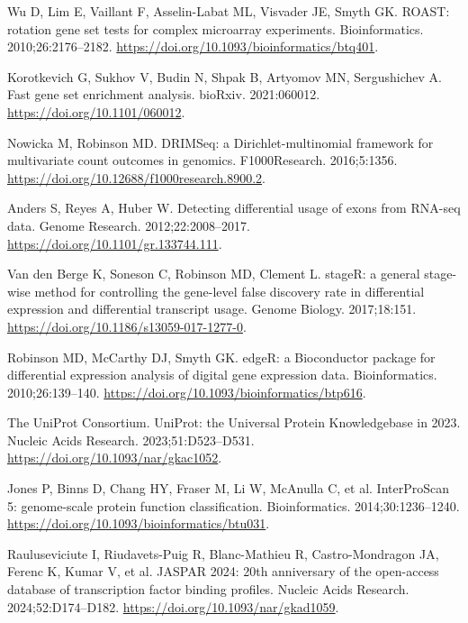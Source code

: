 \documentclass[referee,pdflatex,sn-basic,Numbered]{sn-jnl}
\begin{document}
\begin{enumerate}[label={[\arabic*]},itemsep=2pt,leftmargin=2.6em]
\item Wu D, Lim E, Vaillant F, Asselin-Labat ML, Visvader JE, Smyth GK. ROAST: rotation gene set tests for complex microarray experiments. Bioinformatics. 2010;26:2176--2182. \url{https://doi.org/10.1093/bioinformatics/btq401}.

\item Korotkevich G, Sukhov V, Budin N, Shpak B, Artyomov MN, Sergushichev A. Fast gene set enrichment analysis. bioRxiv. 2021:060012. \url{https://doi.org/10.1101/060012}.

\item Nowicka M, Robinson MD. DRIMSeq: a Dirichlet-multinomial framework for multivariate count outcomes in genomics. F1000Research. 2016;5:1356. \url{https://doi.org/10.12688/f1000research.8900.2}.

\item Anders S, Reyes A, Huber W. Detecting differential usage of exons from RNA-seq data. Genome Research. 2012;22:2008--2017. \url{https://doi.org/10.1101/gr.133744.111}.

\item Van den Berge K, Soneson C, Robinson MD, Clement L. stageR: a general stage-wise method for controlling the gene-level false discovery rate in differential expression and differential transcript usage. Genome Biology. 2017;18:151. \url{https://doi.org/10.1186/s13059-017-1277-0}.

\item Robinson MD, McCarthy DJ, Smyth GK. edgeR: a Bioconductor package for differential expression analysis of digital gene expression data. Bioinformatics. 2010;26:139--140. \url{https://doi.org/10.1093/bioinformatics/btp616}.

\item The UniProt Consortium. UniProt: the Universal Protein Knowledgebase in 2023. Nucleic Acids Research. 2023;51:D523--D531. \url{https://doi.org/10.1093/nar/gkac1052}.

\item Jones P, Binns D, Chang HY, Fraser M, Li W, McAnulla C, et al. InterProScan 5: genome-scale protein function classification. Bioinformatics. 2014;30:1236--1240. \url{https://doi.org/10.1093/bioinformatics/btu031}.

\item Rauluseviciute I, Riudavets-Puig R, Blanc-Mathieu R, Castro-Mondragon JA, Ferenc K, Kumar V, et al. JASPAR 2024: 20th anniversary of the open-access database of transcription factor binding profiles. Nucleic Acids Research. 2024;52:D174--D182. \url{https://doi.org/10.1093/nar/gkad1059}.


\end{enumerate}
\end{document}
